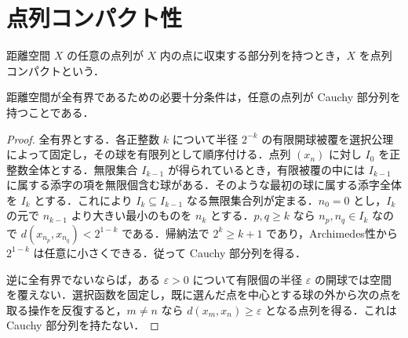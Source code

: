 \section{点列コンパクト性}
\begin{defn}[点列コンパクト空間]
距離空間 $X$ の任意の点列が $X$ 内の点に収束する部分列を持つとき，$X$ を点列コンパクトという．
\end{defn}
\begin{prop}[全有界性とCauchy部分列]
距離空間が全有界であるための必要十分条件は，任意の点列が Cauchy 部分列を持つことである．
\end{prop}
\begin{proof}
全有界とする．各正整数 $k$ について半径 $2^{-k}$ の有限開球被覆を選択公理によって固定し，その球を有限列として順序付ける．点列 $(x_n)$ に対し $I_0$ を正整数全体とする．無限集合 $I_{k-1}$ が得られているとき，有限被覆の中には $I_{k-1}$ に属する添字の項を無限個含む球がある．そのような最初の球に属する添字全体を $I_k$ とする．これにより $I_k\subseteq I_{k-1}$ なる無限集合列が定まる．$n_0=0$ とし，$I_k$ の元で $n_{k-1}$ より大きい最小のものを $n_k$ とする．$p,q\geq k$ なら $n_p,n_q\in I_k$ なので $d(x_{n_p},x_{n_q})<2^{1-k}$ である．帰納法で $2^k\geq k+1$ であり，Archimedes性から $2^{1-k}$ は任意に小さくできる．従って Cauchy 部分列を得る．

逆に全有界でないならば，ある $\varepsilon>0$ について有限個の半径 $\varepsilon$ の開球では空間を覆えない．選択函数を固定し，既に選んだ点を中心とする球の外から次の点を取る操作を反復すると，$m\ne n$ なら $d(x_m,x_n)\geq\varepsilon$ となる点列を得る．これは Cauchy 部分列を持たない．
\end{proof}

